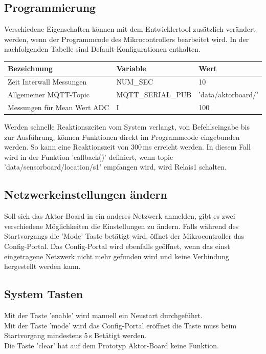 \subsection{Programmierung}
Verschiedene Eigenschaften können mit dem Entwicklertool zusätzlich verändert werden, wenn der Programmcode des Mikrocontrollers bearbeitet wird. In der nachfolgenden Tabelle sind Default-Konfigurationen enthalten.
\begin{table}[H]
\centering
\begin{tabular}{|l|l|l|}
	\hline 
	Bezeichnung & Variable & Wert \\ 
	\hline 
	Zeit Interwall Messungen & NUM\_SEC & 10 \\ 
	\hline 
	Allgemeiner MQTT-Topic  & MQTT\_SERIAL\_PUB & 'data/aktorboard/' \\ 
	\hline 
	Messungen für Mean Wert ADC & I & 100 \\ 
	\hline  
\end{tabular} 	
\end{table}
Werden schnelle Reaktionszeiten vom System verlangt, von Befehlseingabe bis zur Ausführung, können Funktionen direkt im Programmcode eingebunden werden. So kann eine Reaktionszeit von 300\,ms erreicht werden. In diesem Fall wird in der Funktion 'callback()' definiert, wenn topic 'data/sensorboard/location/s1' empfangen wird, wird Relais1 schalten.
\subsection{Netzwerkeinstellungen ändern}
Soll sich das Aktor-Board in ein anderes Netzwerk anmelden, gibt es zwei verschiedene Möglichkeiten die Einstellungen zu ändern. Falls während des Startvorgangs die 'Mode' Taste betätigt wird, öffnet der Mikrocontroller das Config-Portal. Das Config-Portal wird ebenfalls geöffnet, wenn das einst eingetragene Netzwerk nicht mehr gefunden wird und keine Verbindung hergestellt werden kann.
\subsection{System Tasten}
Mit der Taste 'enable' wird manuell ein Neustart durchgeführt. \\
Mit der Taste 'mode' wird das Config-Portal eröffnet die Taste muss beim Startvorgang mindestens 5\,s Betätigt werden.\\
Die Taste 'clear' hat auf dem Prototyp Aktor-Board keine Funktion.

